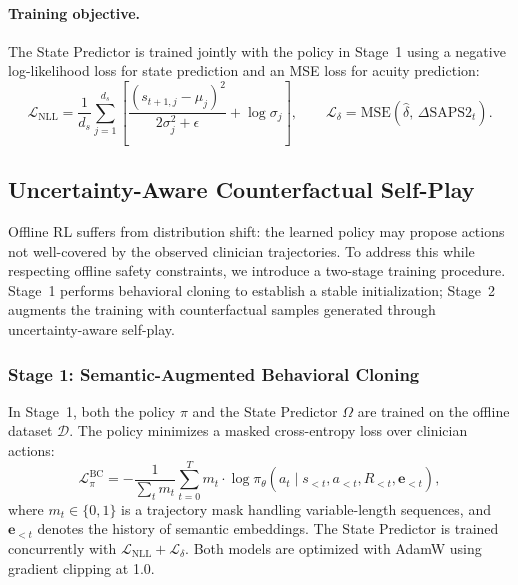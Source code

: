 \paragraph{Training objective.} The State Predictor is trained jointly with the policy in Stage~1 using a negative log-likelihood loss for state prediction and an MSE loss for acuity prediction:
\begin{equation}
    \mathcal{L}_{\text{NLL}} = \frac{1}{d_s}\sum_{j=1}^{d_s}\left[\frac{(s_{t+1,j} - \mu_j)^2}{2\sigma_j^2 + \epsilon} + \log\sigma_j\right], \qquad
    \mathcal{L}_{\delta} = \text{MSE}(\hat{\delta},\, \Delta\text{SAPS2}_t).
\end{equation}

\subsection{Uncertainty-Aware Counterfactual Self-Play}
\label{sec:selfplay}

Offline RL suffers from distribution shift: the learned policy may propose actions not well-covered by the observed clinician trajectories. To address this while respecting offline safety constraints, we introduce a two-stage training procedure. Stage~1 performs behavioral cloning to establish a stable initialization; Stage~2 augments the training with counterfactual samples generated through uncertainty-aware self-play.

\subsubsection{Stage 1: Semantic-Augmented Behavioral Cloning}
\label{sec:stage1}

In Stage~1, both the policy $\pi$ and the State Predictor $\Omega$ are trained on the offline dataset $\mathcal{D}$. The policy minimizes a masked cross-entropy loss over clinician actions:
\begin{equation}
    \mathcal{L}_{\pi}^{\text{BC}} = -\frac{1}{\sum_t m_t}\sum_{t=0}^{T} m_t \cdot \log \pi_\theta(a_t \mid s_{<t}, a_{<t}, \hat{R}_{<t}, \mathbf{e}_{<t}),
\end{equation}
where $m_t \in \{0,1\}$ is a trajectory mask handling variable-length sequences, and $\mathbf{e}_{<t}$ denotes the history of semantic embeddings. The State Predictor is trained concurrently with $\mathcal{L}_{\text{NLL}} + \mathcal{L}_{\delta}$. Both models are optimized with AdamW using gradient clipping at 1.0.


